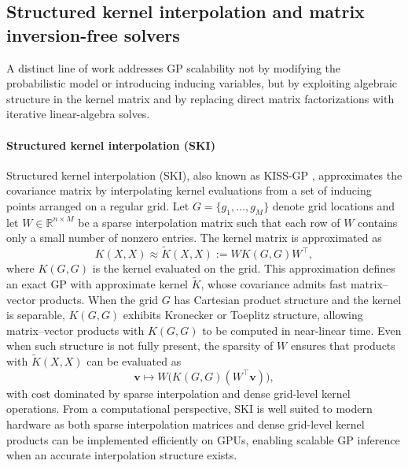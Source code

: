 \documentclass[11pt,a4paper]{article}
\begin{document}
\subsection{Structured kernel interpolation and matrix inversion-free solvers}
\label{subsec:ski-pcg}
A distinct line of work addresses GP scalability not by modifying the probabilistic model or introducing inducing variables, but by exploiting algebraic structure in the kernel matrix and by replacing direct matrix factorizations with iterative linear-algebra solves.

\paragraph{Structured kernel interpolation (SKI)}
Structured kernel interpolation (SKI), also known as KISS-GP \citep{Wilson2015KernelIF}, approximates the covariance matrix by
interpolating kernel evaluations from a set of inducing points arranged on a regular grid.
Let $G=\{g_1,\dots,g_M\}$ denote grid locations and let $W\in\mathbb{R}^{n\times M}$ be a sparse interpolation matrix such that each
row of $W$ contains only a small number of nonzero entries.
The kernel matrix is approximated as
\begin{displaymath}K(X,X) \approx \tilde K(X,X) := W K(G,G) W^\top,\end{displaymath}
where $K(G,G)$ is the kernel evaluated on the grid.
This approximation defines an exact GP with approximate kernel $\tilde K$, whose covariance admits fast matrix--vector products. When the grid $G$ has Cartesian product structure and the kernel is separable, $K(G,G)$ exhibits Kronecker or Toeplitz structure,
allowing matrix--vector products with $K(G,G)$ to be computed in near-linear time.
Even when such structure is not fully present, the sparsity of $W$ ensures that products with $\tilde K(X,X)$ can be evaluated as
\begin{displaymath}\boldsymbol{v} \mapsto W\bigl(K(G,G)(W^\top \boldsymbol{v})\bigr),\end{displaymath}
with cost dominated by sparse interpolation and dense grid-level kernel operations.
From a computational perspective, SKI is well suited to modern hardware as both sparse interpolation matrices and dense grid-level
kernel products can be implemented efficiently on GPUs, enabling scalable GP inference when an accurate interpolation structure
exists.
\end{document}
